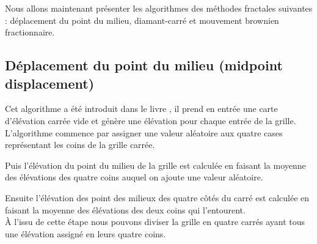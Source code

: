 
Nous allons maintenant présenter les algorithmes des méthodes fractales suivantes : déplacement du point du milieu, diamant-carré et mouvement brownien fractionnaire.

\subsection{Déplacement du point du milieu (midpoint displacement)}
Cet algorithme a été introduit dans le livre \cite{Four82}, il prend en entrée
une carte d'élévation carrée vide et génère une élévation
pour chaque entrée de la grille.\\

L'algorithme commence par assigner une valeur aléatoire aux quatre cases
représentant les coins de la grille carrée.

Puis l'élévation du point du milieu de la grille est calculée en faisant
la moyenne des élévations des quatre coins auquel on ajoute une valeur
aléatoire.

Ensuite l'élévation des point des milieux des quatre côtés du carré est calculée
en faisant la moyenne des élévations des deux coins qui l'entourent.
\\

\`A l'issu de cette étape nous pouvons diviser la grille en quatre carrés
ayant tous une élévation assigné en leurs quatre coins.\\


